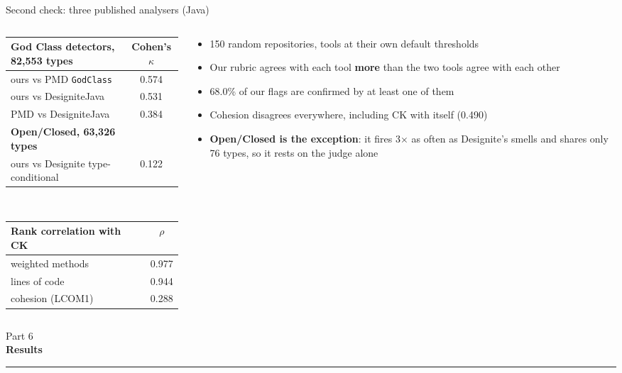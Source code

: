 \documentclass[11pt,aspectratio=169]{beamer}
\newcommand{\divider}[2]{%
  \begin{frame}[plain]
  \vfill
  \begin{center}
    {\small\color{accentgray} #1}\\[6pt]
    {\LARGE\bfseries\color{issatblue} #2}\\[6pt]
    {\color{issatgold}\rule{0.3\textwidth}{1.1pt}}
  \end{center}
  \vfill
  \end{frame}}
\begin{document}
\begin{frame}{Second check: three published analysers (Java)}
\begin{columns}[T,onlytextwidth]
\begin{column}{0.55\textwidth}
\small
\begin{tabular}{@{}lc@{}}
\toprule
\textbf{God Class detectors, 82,553 types} & \textbf{Cohen's $\kappa$} \\
\midrule
ours vs PMD \texttt{GodClass} & 0.574 \\
ours vs DesigniteJava & 0.531 \\
PMD vs DesigniteJava & 0.384 \\
\midrule
\textbf{Open/Closed, 63,326 types} & \\
ours vs Designite type-conditional & \alert{0.122} \\
\bottomrule
\end{tabular}\\[8pt]
\begin{tabular}{@{}lc@{}}
\toprule
\textbf{Rank correlation with CK} & \textbf{$\rho$} \\
\midrule
weighted methods & 0.977 \\
lines of code & 0.944 \\
cohesion (LCOM1) & 0.288 \\
\bottomrule
\end{tabular}
\end{column}
\begin{column}{0.41\textwidth}
\begin{itemize}\setlength{\itemsep}{4pt}\small
  \item 150 random repositories, tools at their own default thresholds
  \item Our rubric agrees with each tool \textbf{more} than the two tools agree with each other
  \item 68.0\% of our flags are confirmed by at least one of them
  \item Cohesion disagrees everywhere, including CK with itself (0.490)
  \item \textbf{Open/Closed is the exception}: it fires 3$\times$ as often as Designite's smells and
        shares only 76 types, so it rests on the judge alone
\end{itemize}
\end{column}
\end{columns}
\end{frame}

\divider{Part 6}{Results}
\end{document}
